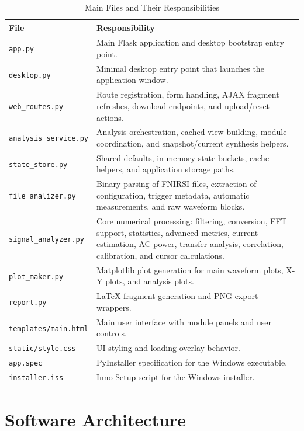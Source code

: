 \documentclass[conference]{IEEEtran}
\begin{document}
\begin{table}[ht]
\caption{Main Files and Their Responsibilities}
\label{tab:repo-structure}
\centering
\begin{tabularx}{\columnwidth}{>{\raggedright\arraybackslash}p{} X}
\toprule
\textbf{File} & \textbf{Responsibility} \\
\midrule
\texttt{app.py} & Main Flask application and desktop bootstrap entry point. \\
\texttt{desktop.py} & Minimal desktop entry point that launches the application window. \\
\texttt{web\_routes.py} & Route registration, form handling, AJAX fragment refreshes, download endpoints, and upload/reset actions. \\
\texttt{analysis\_service.py} & Analysis orchestration, cached view building, module coordination, and snapshot/current synthesis helpers. \\
\texttt{state\_store.py} & Shared defaults, in-memory state buckets, cache helpers, and application storage paths. \\
\texttt{file\_analizer.py} & Binary parsing of FNIRSI files, extraction of configuration, trigger metadata, automatic measurements, and raw waveform blocks. \\
\texttt{signal\_analyzer.py} & Core numerical processing: filtering, conversion, FFT support, statistics, advanced metrics, current estimation, AC power, transfer analysis, correlation, calibration, and cursor calculations. \\
\texttt{plot\_maker.py} & Matplotlib plot generation for main waveform plots, X-Y plots, and analysis plots. \\
\texttt{report.py} & LaTeX fragment generation and PNG export wrappers. \\
\texttt{templates/main.html} & Main user interface with module panels and user controls. \\
\texttt{static/style.css} & UI styling and loading overlay behavior. \\
\texttt{app.spec} & PyInstaller specification for the Windows executable. \\
\texttt{installer.iss} & Inno Setup script for the Windows installer. \\
\bottomrule
\end{tabularx}
\end{table}

\section{Software Architecture}
\end{document}
